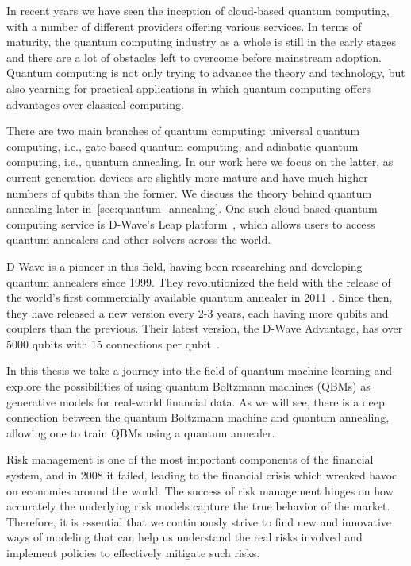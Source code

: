 In recent years we have seen the inception of cloud-based quantum computing, with a number of different providers offering various services.
In terms of maturity, the quantum computing industry as a whole is still in the early stages and there are a lot of obstacles left to overcome before mainstream adoption.
Quantum computing is not only trying to advance the theory and technology, but also yearning for practical applications in which quantum computing offers advantages over classical computing.

There are two main branches of quantum computing: universal quantum computing, i.e., gate-based quantum computing, and adiabatic quantum computing, i.e., quantum annealing.
In our work here we focus on the latter, as current generation devices are slightly more mature and have much higher numbers of qubits than the former.
We discuss the theory behind quantum annealing later in~\cref{sec:quantum_annealing}.
One such cloud-based quantum computing service is D-Wave's Leap platform~\cite{dwave_leap}, which allows users to access quantum annealers and other solvers across the world.

D-Wave is a pioneer in this field, having been researching and developing quantum annealers since 1999.
They revolutionized the field with the release of the world's first commercially available quantum annealer in 2011~\cite{zyga_2011}.
Since then, they have released a new version every 2-3 years, each having more qubits and couplers than the previous.
Their latest version, the D-Wave Advantage, has over 5000 qubits with 15 connections per qubit~\cite{dwave_advantage}.

In this thesis we take a journey into the field of quantum machine learning and explore the possibilities of using quantum Boltzmann machines (QBMs) as generative models for real-world financial data.
As we will see, there is a deep connection between the quantum Boltzmann machine and quantum annealing, allowing one to train QBMs using a quantum annealer.

Risk management is one of the most important components of the financial system, and in 2008 it failed, leading to the financial crisis which wreaked havoc on economies around the world.
The success of risk management hinges on how accurately the underlying risk models capture the true behavior of the market.
Therefore, it is essential that we continuously strive to find new and innovative ways of modeling that can help us understand the real risks involved and implement policies to effectively mitigate such risks.

